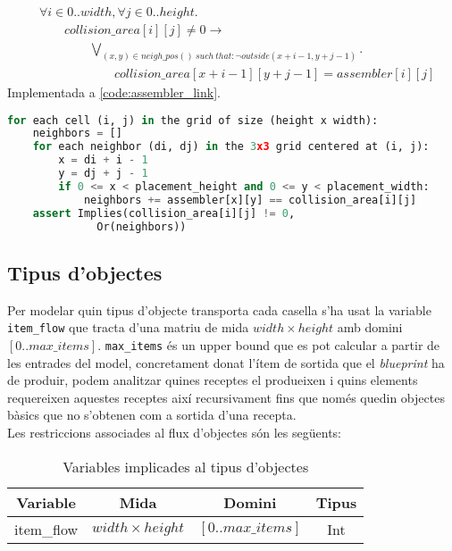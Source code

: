 \begin{align*}
    & \forall i \in 0..width, \forall j \in 0..height. \\
    & \qquad collision\_area[i][j]\neq0 \rightarrow \\
    & \qquad \qquad  \bigvee_{(x, y) \in neigh\_pos() \ such \ that: \neg outside(x+i-1, y+j-1)}.\\
    & \qquad \qquad \qquad collision\_area[x+i-1][y+j-1] = assembler[i][j]
\end{align*}
Implementada a \ref{code:assembler_link}.

\begin{lstlisting}[language=Python, caption=Link Assembler Collision, label=code:assembler_link]
for each cell (i, j) in the grid of size (height x width):
    neighbors = []
    for each neighbor (di, dj) in the 3x3 grid centered at (i, j):
        x = di + i - 1
        y = dj + j - 1
        if 0 <= x < placement_height and 0 <= y < placement_width:
            neighbors += assembler[x][y] == collision_area[i][j]
    assert Implies(collision_area[i][j] != 0,
              Or(neighbors))
\end{lstlisting}

\subsection{Tipus d'objectes}
Per modelar quin tipus d'objecte transporta cada casella s'ha usat la variable \lstinline{item_flow} que tracta d'una matriu de mida $width \times height$ amb domini $[0..max\_items]$. \lstinline{max_items} és un upper bound que es pot calcular a partir de les entrades del model, concretament donat l'ítem de sortida que el \textit{blueprint} ha de produir, podem analitzar quines receptes el produeixen i quins elements requereixen aquestes receptes així recursivament fins que només quedin objectes bàsics que no s'obtenen com a sortida d'una recepta.\\
Les restriccions associades al flux d'objectes són les següents:
\begin{table}[h]
    \centering
    \begin{tabular}{|c|c|c|c|}
    \hline
    \textbf{Variable} & \textbf{Mida} & \textbf{Domini} & \textbf{Tipus}\\
    \hline
    item\_flow & $width \times height$ & $[0..max\_items]$ & Int\\
    \hline
    \end{tabular}
    \caption{Variables implicades al tipus d'objectes}
    \label{item_flow-variables}
\end{table}

